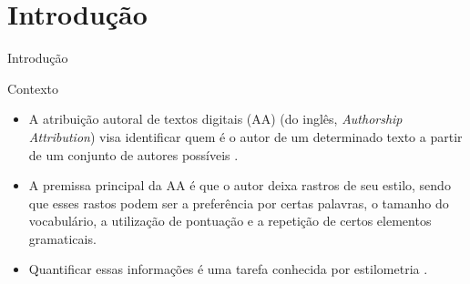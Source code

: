 \section{Introdução}

\begin{frame}{Introdução}
	\begin{alertblock}{Contexto}
		\begin{itemize}\itemsep9pt
		\item A atribuição autoral de textos digitais (AA) (do inglês, {\it Authorship Attribution})  visa identificar quem é o autor de um determinado texto a partir de um conjunto de autores possíveis \cite{Potthast2017}.
		
		\item A premissa principal da AA é que o autor deixa rastros de seu estilo, sendo que esses rastos podem ser a preferência por certas palavras, o tamanho do vocabulário, a utilização de pontuação e a repetição de certos elementos gramaticais.
		
		\item Quantificar essas informações é uma tarefa conhecida por estilometria \cite{Stamatatos2009}.
		
		\end{itemize}
	
		
	\end{alertblock}

\end{frame}

